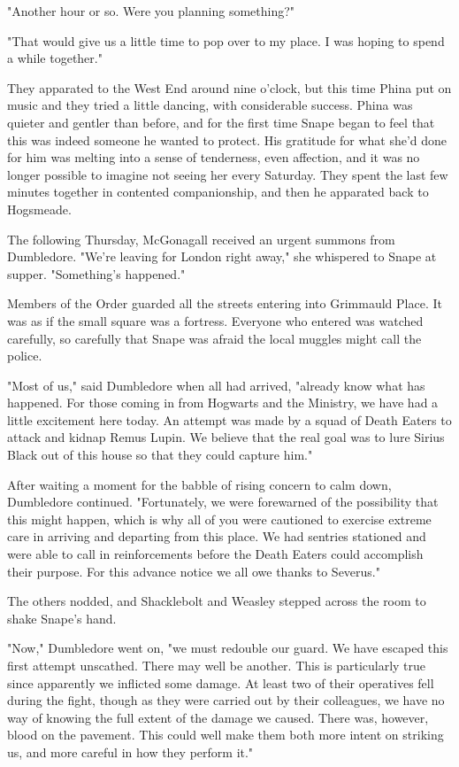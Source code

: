 \documentclass[a4paper,11pt]{article}
\begin{document}
"Another hour or so. Were you planning something?"

"That would give us a little time to pop over to my place. I was hoping to spend a while together."

They apparated to the West End around nine o'clock, but this time Phina put on music and they tried a little dancing, with considerable success. Phina was quieter and gentler than before, and for the first time Snape began to feel that this was indeed someone he wanted to protect. His gratitude for what she'd done for him was melting into a sense of tenderness, even affection, and it was no longer possible to imagine not seeing her every Saturday. They spent the last few minutes together in contented companionship, and then he apparated back to Hogsmeade.

The following Thursday, McGonagall received an urgent summons from Dumbledore. "We're leaving for London right away," she whispered to Snape at supper. "Something's happened."

Members of the Order guarded all the streets entering into Grimmauld Place. It was as if the small square was a fortress. Everyone who entered was watched carefully, so carefully that Snape was afraid the local muggles might call the police.

"Most of us," said Dumbledore when all had arrived, "already know what has happened. For those coming in from Hogwarts and the Ministry, we have had a little excitement here today. An attempt was made by a squad of Death Eaters to attack and kidnap Remus Lupin. We believe that the real goal was to lure Sirius Black out of this house so that they could capture him."

After waiting a moment for the babble of rising concern to calm down, Dumbledore continued. "Fortunately, we were forewarned of the possibility that this might happen, which is why all of you were cautioned to exercise extreme care in arriving and departing from this place. We had sentries stationed and were able to call in reinforcements before the Death Eaters could accomplish their purpose. For this advance notice we all owe thanks to Severus."

The others nodded, and Shacklebolt and Weasley stepped across the room to shake Snape's hand.

"Now," Dumbledore went on, "we must redouble our guard. We have escaped this first attempt unscathed. There may well be another. This is particularly true since apparently we inflicted some damage. At least two of their operatives fell during the fight, though as they were carried out by their colleagues, we have no way of knowing the full extent of the damage we caused. There was, however, blood on the pavement. This could well make them both more intent on striking us, and more careful in how they perform it."
\end{document}

